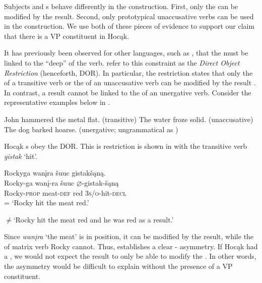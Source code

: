 \documentclass[output=paper]{LSP/langsci}
\begin{document}
 
Subjects and s behave differently in the  construction. First, only the  can be modified by the result. Second, only prototypical unaccusative verbs can be used in the  construction. We use both of these pieces of evidence to support our claim that there is a VP constituent in Hocąk.
 

It has previously been observed for other languages, such as , that the   must be linked to the ``deep''  of the verb.  \citet{LevinRappaportHovav1995} refer to this constraint as the \textit{Direct Object Restriction} (henceforth, DOR). In particular, the restriction states that only the  of a transitive verb or the  of an unaccusative verb can be modified by the result . In contrast, a result  cannot be linked to the  of an unergative verb. Consider the representative  examples below in .

\begin{exe}
\ex\label{ex:jrs:46}
\begin{xlist}
\ex John hammered the metal flat.	(transitive)
\ex The water froze solid.						(unaccusative)
\ex *The dog barked hoarse.	(unergative; ungrammatical as )
\end{xlist}
\end{exe}
	
 
Hocąk s obey the DOR. This is restriction is shown in  with the transitive verb \textit{gistak} `hit'.
 

\begin{exe}
\ex\label{ex:jrs:47} 
\glll Rockyga			wan\k{i}ra			\v{s}uuc 		gistak\v{s}ąną.\\
Rocky-ga		wan\k{i}-ra		\v{s}uuc		$\varnothing$-gistak-\v{s}ąną \\
Rocky-\textsc{prop}	meat-\textsc{def}	red			\textsc{3s/o}-hit-\textsc{decl} \\
\trans = `Rocky hit the meat red.'

$\neq$`Rocky hit the meat red and he was red as a result.'
\end{exe}

 
Since \textit{wan\k{i}ra} `the meat' is in  position, it can be modified by the result, while the  of matrix verb Rocky cannot. Thus,  establishes a clear - asymmetry. If Hocąk had a , we would not expect the result to only be able to modify the . In other words, the asymmetry would be difficult to explain without the presence of a VP constituent.
	
\end{document}
